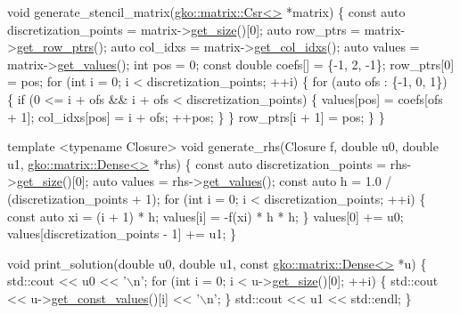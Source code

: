 \begin{DoxyCodeInclude}
\textcolor{keywordtype}{void} generate\_stencil\_matrix(\hyperlink{classgko_1_1matrix_1_1Csr}{gko::matrix::Csr<>} *matrix)
\{
    \textcolor{keyword}{const} \textcolor{keyword}{auto} discretization\_points = matrix->\hyperlink{classgko_1_1LinOp_a31b3c003388eb0b95393154f68c2b98d}{get\_size}()[0];
    \textcolor{keyword}{auto} row\_ptrs = matrix->\hyperlink{classgko_1_1matrix_1_1Csr_a068e5158cf282fa977f0a137f8cd7f03}{get\_row\_ptrs}();
    \textcolor{keyword}{auto} col\_idxs = matrix->\hyperlink{classgko_1_1matrix_1_1Csr_a81c6294177a1be4873804c8a85a9fc64}{get\_col\_idxs}();
    \textcolor{keyword}{auto} values = matrix->\hyperlink{classgko_1_1matrix_1_1Csr_a929b0a194e6aeb1252b8e6781d162e83}{get\_values}();
    \textcolor{keywordtype}{int} pos = 0;
    \textcolor{keyword}{const} \textcolor{keywordtype}{double} coefs[] = \{-1, 2, -1\};
    row\_ptrs[0] = pos;
    \textcolor{keywordflow}{for} (\textcolor{keywordtype}{int} i = 0; i < discretization\_points; ++i) \{
        \textcolor{keywordflow}{for} (\textcolor{keyword}{auto} ofs : \{-1, 0, 1\}) \{
            \textcolor{keywordflow}{if} (0 <= i + ofs && i + ofs < discretization\_points) \{
                values[pos] = coefs[ofs + 1];
                col\_idxs[pos] = i + ofs;
                ++pos;
            \}
        \}
        row\_ptrs[i + 1] = pos;
    \}
\}


\textcolor{keyword}{template} <\textcolor{keyword}{typename} Closure>
\textcolor{keywordtype}{void} generate\_rhs(Closure f, \textcolor{keywordtype}{double} u0, \textcolor{keywordtype}{double} u1, \hyperlink{classgko_1_1matrix_1_1Dense}{gko::matrix::Dense<>} *rhs)
\{
    \textcolor{keyword}{const} \textcolor{keyword}{auto} discretization\_points = rhs->\hyperlink{classgko_1_1LinOp_a31b3c003388eb0b95393154f68c2b98d}{get\_size}()[0];
    \textcolor{keyword}{auto} values = rhs->\hyperlink{classgko_1_1matrix_1_1Dense_a3bc458e02fab8e4c9f60f70bd4d5a4f9}{get\_values}();
    \textcolor{keyword}{const} \textcolor{keyword}{auto} h = 1.0 / (discretization\_points + 1);
    \textcolor{keywordflow}{for} (\textcolor{keywordtype}{int} i = 0; i < discretization\_points; ++i) \{
        \textcolor{keyword}{const} \textcolor{keyword}{auto} xi = (i + 1) * h;
        values[i] = -f(xi) * h * h;
    \}
    values[0] += u0;
    values[discretization\_points - 1] += u1;
\}


\textcolor{keywordtype}{void} print\_solution(\textcolor{keywordtype}{double} u0, \textcolor{keywordtype}{double} u1, \textcolor{keyword}{const} \hyperlink{classgko_1_1matrix_1_1Dense}{gko::matrix::Dense<>} *u)
\{
    std::cout << u0 << \textcolor{charliteral}{'\(\backslash\)n'};
    \textcolor{keywordflow}{for} (\textcolor{keywordtype}{int} i = 0; i < u->\hyperlink{classgko_1_1LinOp_a31b3c003388eb0b95393154f68c2b98d}{get\_size}()[0]; ++i) \{
        std::cout << u->\hyperlink{classgko_1_1matrix_1_1Dense_ab83c739c1b11abaecc3bfd89506f6c9c}{get\_const\_values}()[i] << \textcolor{charliteral}{'\(\backslash\)n'};
    \}
    std::cout << u1 << std::endl;
\}



\end{DoxyCodeInclude}
